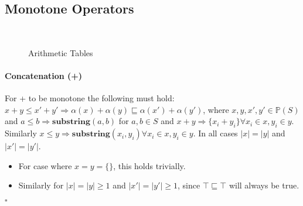 \documentclass{article}
\newcommand{\powerset}[1]{\mathbb{P}(#1)}
\begin{document}
\subsection{Monotone Operators}
\begin{figure*}

\centering
{}~~~~~
\caption{Arithmetic Tables}
\label{fig:table}
\end{figure*}


\paragraph{Concatenation (+)}
For + to be monotone the following must hold: $x+y \leq x'+y' \Rightarrow  \alpha(x)+\alpha(y) \sqsubseteq \alpha(x')+\alpha(y')$, where $x,y,x',y' \in \powerset{S}$ and $a \leq b \Rightarrow \mathbf{substring}(a,b)$ for $a,b \in S$ and $x+y \Rightarrow \{x_i+y_i\} \forall x_i \in x, y_i \in y$.  Similarly $x \leq y \Rightarrow \mathbf{substring}(x_i, y_i) \forall x_i \in x, y_i \in y$.  In all cases $|x| = |y|$ and $|x'| = |y'|$.

\begin{itemize}
	\item For case where $x = y = \{\}$, this holds trivially.
	\item Similarly for $|x| = |y| \geq 1$ and $|x'| = |y'| \geq 1$, since $\top \sqsubseteq \top$ will always be true.
\end{itemize}
$\square$
\end{document}
